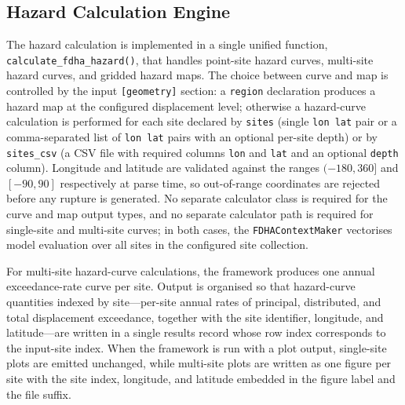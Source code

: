 \subsection{Hazard Calculation Engine}
\label{sec:architecture:hazard_engine}

The hazard calculation is implemented in a single unified function, \texttt{calculate\_fdha\_hazard()}, that handles point-site hazard curves, multi-site hazard curves, and gridded hazard maps. The choice between curve and map is controlled by the input \texttt{[geometry]} section: a \texttt{region} declaration produces a hazard map at the configured displacement level; otherwise a hazard-curve calculation is performed for each site declared by \texttt{sites} (single \texttt{lon~lat} pair or a comma-separated list of \texttt{lon~lat} pairs with an optional per-site depth) or by \texttt{sites\_csv} (a CSV file with required columns \texttt{lon} and \texttt{lat} and an optional \texttt{depth} column). Longitude and latitude are validated against the ranges $(-180, 360]$ and $[-90, 90]$ respectively at parse time, so out-of-range coordinates are rejected before any rupture is generated. No separate calculator class is required for the curve and map output types, and no separate calculator path is required for single-site and multi-site curves; in both cases, the \texttt{FDHAContextMaker} vectorises model evaluation over all sites in the configured site collection.

For multi-site hazard-curve calculations, the framework produces one annual exceedance-rate curve per site. Output is organised so that hazard-curve quantities indexed by site---per-site annual rates of principal, distributed, and total displacement exceedance, together with the site identifier, longitude, and latitude---are written in a single results record whose row index corresponds to the input-site index. When the framework is run with a plot output, single-site plots are emitted unchanged, while multi-site plots are written as one figure per site with the site index, longitude, and latitude embedded in the figure label and the file suffix.


